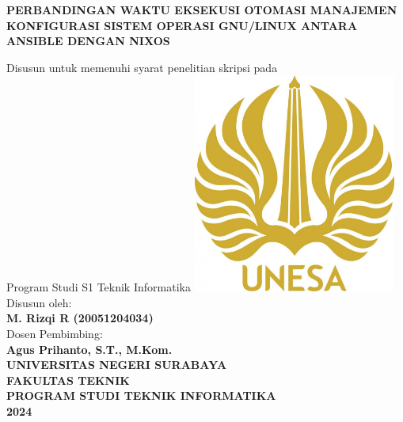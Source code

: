\begin{titlepage}
	\begin{center}
		{\large \textbf{PERBANDINGAN WAKTU EKSEKUSI OTOMASI MANAJEMEN KONFIGURASI SISTEM OPERASI GNU/LINUX ANTARA ANSIBLE DENGAN NIXOS\\}}
		\vspace{0.5cm}

		Disusun untuk memenuhi syarat penelitian skripsi pada \\
		Program Studi S1 Teknik Informatika
		\vfill
		\includegraphics[width=0.5\textwidth]{images/unesa.jpg}\\
		\vspace*{1cm}
		Disusun oleh:\\
		\textbf{M. Rizqi R (20051204034)}\\
		Dosen Pembimbing:\\
		\textbf{Agus Prihanto, S.T., M.Kom.}\\
		\vfill
		{\large \textbf{UNIVERSITAS NEGERI SURABAYA\\ FAKULTAS TEKNIK \\ PROGRAM STUDI TEKNIK INFORMATIKA \\ 2024}}
	\end{center}
\end{titlepage}
